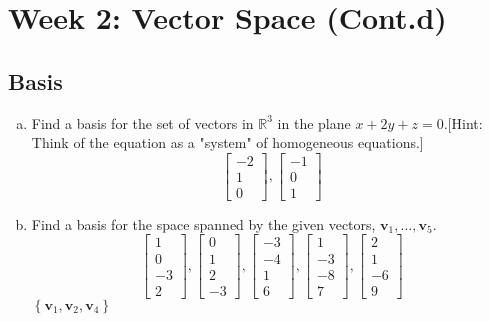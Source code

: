 \newpage
\section{Week 2: Vector Space (Cont.d)}
\subsection{Basis}
\begin{enumerate}[(a)]
    \item Find a basis for the set of vectors in $\mathbb{R}^{3}$ in the plane $x+2 y+z=0$.[Hint: Think of the equation as a "system" of homogeneous equations.]
    $$
    \left[\begin{array}{r}-2 \\ 1 \\ 0\end{array}\right],\left[\begin{array}{r}-1 \\ 0 \\ 1\end{array}\right]
    $$
    \item Find a basis for the space spanned by the given vectors, $\mathbf{v}_{1}, \ldots, \mathbf{v}_{5}$.
    $$
    \left[\begin{array}{r}1 \\ 0 \\ -3 \\ 2\end{array}\right],\left[\begin{array}{r}0 \\ 1 \\ 2 \\ -3\end{array}\right],\left[\begin{array}{r}-3 \\ -4 \\ 1 \\ 6\end{array}\right],\left[\begin{array}{r}1 \\ -3 \\ -8 \\ 7\end{array}\right],\left[\begin{array}{r}2 \\ 1 \\ -6 \\ 9\end{array}\right]
    $$
    $\left\{\mathbf{v}_{1}, \mathbf{v}_{2}, \mathbf{v}_{4}\right\}$

\end{enumerate}
